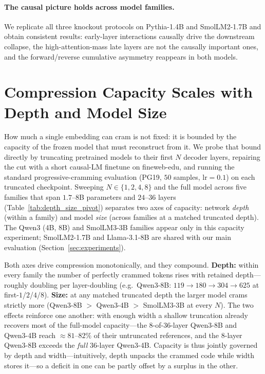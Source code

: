 \documentclass{article}
\theoremstyle{plain}
\theoremstyle{definition}
\theoremstyle{remark}
\begin{document}
\paragraph{The causal picture holds across model families.}
We replicate all three knockout protocols on Pythia-1.4B and SmolLM2-1.7B and obtain consistent results: early-layer interactions causally drive the downstream collapse, the high-attention-mass late layers are not the causally important ones, and the forward/reverse cumulative asymmetry reappears in both models.


\section{Compression Capacity Scales with Depth and Model Size}
\label{sec:depth_size}

How much a single embedding can cram is not fixed: it is bounded by the capacity of the frozen model that must reconstruct from it. We probe that bound directly by truncating pretrained models to their first $N$ decoder layers, repairing the cut with a short causal-LM finetune on fineweb-edu, and running the standard progressive-cramming evaluation (PG19, $50$ samples, $\mathrm{lr}=0.1$) on each truncated checkpoint. Sweeping $N \in \{1,2,4,8\}$ and the full model across five families that span $1.7$--$8$B parameters and $24$--$36$ layers (Table~\ref{tab:depth_size_pivot}) separates two axes of capacity: network \emph{depth} (within a family) and model \emph{size} (across families at a matched truncated depth). The Qwen3 (4B, 8B) and SmolLM3-3B families appear only in this capacity experiment; SmolLM2-1.7B and Llama-3.1-8B are shared with our main evaluation (Section~\ref{sec:experiments}).

Both axes drive compression monotonically, and they compound. \textbf{Depth:} within every family the number of perfectly crammed tokens rises with retained depth---roughly doubling per layer-doubling (e.g.\ Qwen3-8B: $119 \to 180 \to 304 \to 625$ at first-$1$/$2$/$4$/$8$). \textbf{Size:} at any matched truncated depth the larger model crams strictly more (Qwen3-8B $>$ Qwen3-4B $>$ SmolLM3-3B at every $N$). The two effects reinforce one another: with enough width a shallow truncation already recovers most of the full-model capacity---the $8$-of-$36$-layer Qwen3-8B and Qwen3-4B reach ${\approx}81$--$82\%$ of their untruncated references, and the $8$-layer Qwen3-8B exceeds the \emph{full} $36$-layer Qwen3-4B. Capacity is thus jointly governed by depth and width---intuitively, depth unpacks the crammed code while width stores it---so a deficit in one can be partly offset by a surplus in the other.
\end{document}
